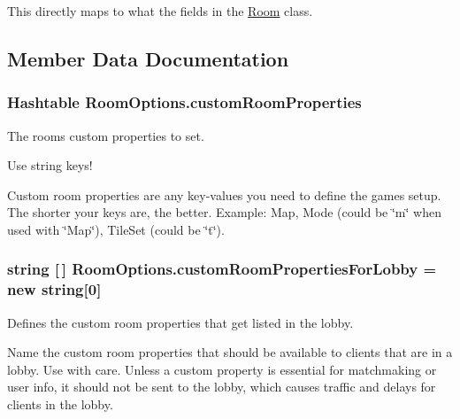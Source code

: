 This directly maps to what the fields in the \hyperlink{class_room}{Room} class.

\subsection{Member Data Documentation}
\subsubsection[{\texorpdfstring{custom\+Room\+Properties}{customRoomProperties}}]{\setlength{\rightskip}{0pt plus 5cm}Hashtable Room\+Options.\+custom\+Room\+Properties}\hypertarget{class_room_options_a0bc17f8465ed615ce0126674af329a1f}{}\label{class_room_options_a0bc17f8465ed615ce0126674af329a1f}


The room\textquotesingle{}s custom properties to set. 

Use string keys!

Custom room properties are any key-\/values you need to define the game\textquotesingle{}s setup. The shorter your keys are, the better. Example\+: Map, Mode (could be \char`\"{}m\char`\"{} when used with \char`\"{}\+Map\char`\"{}), Tile\+Set (could be \char`\"{}t\char`\"{}). 
\subsubsection[{\texorpdfstring{custom\+Room\+Properties\+For\+Lobby}{customRoomPropertiesForLobby}}]{\setlength{\rightskip}{0pt plus 5cm}string \mbox{[}$\,$\mbox{]} Room\+Options.\+custom\+Room\+Properties\+For\+Lobby = new string\mbox{[}0\mbox{]}}\hypertarget{class_room_options_a8c4bca19c674840296f924ec701b9ee1}{}\label{class_room_options_a8c4bca19c674840296f924ec701b9ee1}


Defines the custom room properties that get listed in the lobby. 

Name the custom room properties that should be available to clients that are in a lobby. Use with care. Unless a custom property is essential for matchmaking or user info, it should not be sent to the lobby, which causes traffic and delays for clients in the lobby.

